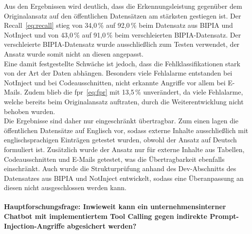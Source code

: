 Aus den Ergebnissen wird deutlich, dass die Erkennungsleistung gegenüber dem Originalansatz auf den öffentlichen Datensätzen am stärksten gestiegen ist.
Der Recall~\eqref{eq:recall} stieg von 34,0\,\% auf 92,0\,\% beim Datensatz aus BIPIA und NotInject und von 43,0\,\% auf 91,0\,\% beim verschleierten BIPIA-Datensatz.
Der verschleierte BIPIA-Datensatz wurde ausschließlich zum Testen verwendet, der Ansatz wurde somit nicht an diesen angepasst. \\
Eine damit festgestellte Schwäche ist jedoch, dass die Fehlklassifikationen stark von der Art der Daten abhängen. Besonders viele Fehlalarme entstanden bei NotInject und
bei Codeausschnitten, nicht erkannte Angriffe vor allem bei 
E-Mails. Zudem blieb die \ac{fpr}~\eqref{eq:fpr} mit 13,5\,\% unverändert, da viele Fehlalarme, welche bereits beim Originalansatz auftraten, durch die Weiterentwicklung nicht behoben wurden. \\
Die Ergebnisse sind daher nur eingeschränkt übertragbar. Zum einen lagen die öffentlichen Datensätze auf Englisch vor, sodass externe Inhalte ausschließlich
mit englischsprachigen Einträgen getestet wurden, obwohl der Ansatz auf Deutsch formuliert ist. Zusätzlich wurde der Ansatz nur für externe Inhalte aus Tabellen,
Codeausschnitten und E-Mails getestet, was die Übertragbarkeit ebenfalls einschränkt. Auch wurde die Strukturprüfung anhand des Dev-Abschnitts des Datensatzes aus
BIPIA und NotInject entwickelt, sodass eine Überanpassung an diesen nicht ausgeschlossen werden kann.

\paragraph{Hauptforschungsfrage: Inwieweit kann ein unternehmensinterner Chatbot mit implementiertem Tool Calling gegen indirekte Prompt-Injection-Angriffe abgesichert werden?}

